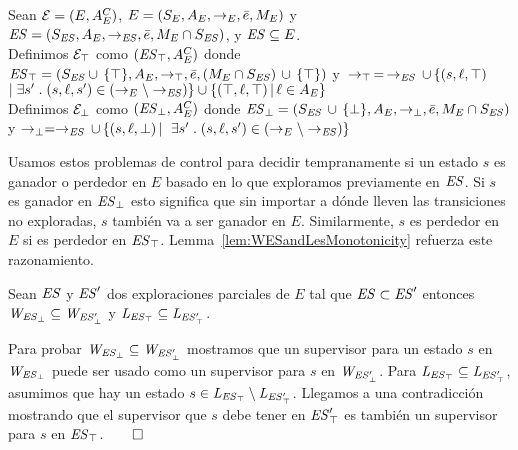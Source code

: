 \begin{definition}
 \label{def:unexploredTo}

Sean $\mathcal{E} = (E, A_E^C)$, $E = (S_E,A_E,\rightarrow_E,\bar{e},M_E)$ y $\mathit{ES} = 
(S_{\mathit{ES}},A_E, \rightarrow_{\mathit{ES}},\bar{e},M_E \cap S_{\mathit{ES}})$, y $\mathit{ES} 
\subseteq E$.
\\
Definimos $\mathcal{E}_\top$ como $(\mathit{\mathit{ES}_{\top}}, A_E^C)$ donde 
$\mathit{\mathit{ES}_{\top}} = (S_{\mathit{ES}} \cup \, \{\top\},A_E,\rightarrow_\top, 
\bar{e}, 
(M_E \cap S_{\mathit{ES}})\, \cup \, \{\top\})$ y $\, \rightarrow_\top \, = \, \rightarrow_{\mathit{ES}} 
\, 
\cup\, \{(s,\ell, \top) 
\;$ $ | \; \exists s' \;.\; (s, \ell, s') \in (\rightarrow_E \setminus \rightarrow_{\mathit{ES}})\} \cup \{(\top, \ell, \top) \, | \, \ell \in A_E\}$ \\
Definimos $\mathcal{E}_\bot$ como $(\mathit{\mathit{ES}_{\bot}}, A_E^C)$ donde 
$\mathit{\mathit{ES}_{\bot}} = (S_{\mathit{ES}} \, \cup \, 
\{\bot\},A_E,\rightarrow_\bot, 
\bar{e}, M_E \cap S_{\mathit{ES}})$ y $\rightarrow_\bot = \rightarrow_{\mathit{ES}} \, \cup \, \{(s,\ell, 
\bot) \, | \, $ $ \exists s' \;.\; (s, \ell, s') \in (\rightarrow_E \setminus \rightarrow_{\mathit{ES}})\}$ 
\end{definition}

Usamos estos problemas de control para decidir tempranamente si un estado $s$ es ganador o perdedor en $E$ basado en lo que exploramos previamente en $\mathit{ES}$. Si $s$ es ganador en $\mathit{\mathit{ES}_{\bot}}$ esto significa que sin importar a dónde lleven las transiciones no exploradas, $s$ también va a ser ganador en $E$. Similarmente, $s$ es perdedor en $E$ si es perdedor en $\mathit{\mathit{ES}_{\top}}$.
Lemma~\ref{lem:WESandLesMonotonicity} refuerza este razonamiento.


\begin{lemma}
\label{lem:WESandLesMonotonicity}
Sean $\mathit{ES}$ y $\mathit{ES}'$ dos exploraciones parciales de $E$ tal que $\mathit{ES} 
\subset \mathit{ES}'$ entonces $\mathit{W_{\mathit{\mathit{ES}_{\bot}}}} \subseteq \mathit{W_{\mathit{\mathit{ES}'_{\bot}}}}$ y $\mathit{L_{\mathit{\mathit{ES}_{\top}}}} \subseteq 
\mathit{L_{\mathit{\mathit{ES}'_{\top}}}}$.
\end{lemma}

\begin{Proof Sketch}
Para probar $\mathit{W_{\mathit{\mathit{ES}_{\bot}}}} \subseteq \mathit{W_{\mathit{\mathit{ES}'_{\bot}}}}$ mostramos que un supervisor para un estado $s$ en $\mathit{W_{\mathit{\mathit{ES}_{\bot}}}}$ 
puede ser usado como un supervisor para $s$ en $\mathit{W_{\mathit{\mathit{ES}'_{\bot}}}}$. Para $\mathit{L_{\mathit{\mathit{ES}_{\top}}}} \subseteq 
\mathit{L_{\mathit{\mathit{ES}'_{\top}}}}$, asumimos que hay un estado $s \in \mathit{L_{\mathit{\mathit{ES}_{\top}}}} \setminus \mathit{L_{\mathit{\mathit{ES}'_{\top}}}} $. Llegamos a una contradicción mostrando que el supervisor que $s$ debe tener en
$\mathit{\mathit{ES}'_{\top}}$ es también un supervisor para $s$ en $\mathit{\mathit{ES}_{\top}}$.\hfill$\qed$
\end{Proof Sketch}

